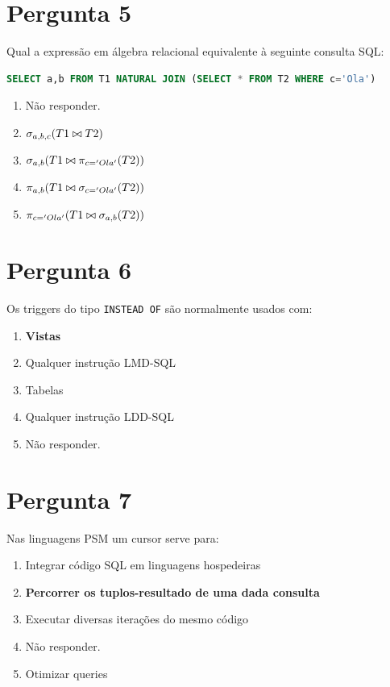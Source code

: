 {\newpage
\section{Pergunta 5}
Qual a expressão em álgebra relacional equivalente à seguinte consulta SQL:
\begin{lstlisting}[language=SQL]
SELECT a,b FROM T1 NATURAL JOIN (SELECT * FROM T2 WHERE c='Ola')
\end{lstlisting}
\begin{enumerate}[label=\alph*.]\itemsep0em
    \item Não responder.
    \item $\sigma_{a,b,c}(T1 \bowtie T2)$
    \item $\sigma_{a,b}(T1 \bowtie \pi_{c='Ola'}(T2))$
    \item \textbf{$\pi_{a,b}(T1 \bowtie \sigma_{c='Ola'}(T2))$ \greencheckmark}
    \item $\pi_{c='Ola'}(T1 \bowtie \sigma_{a,b}(T2))$
\end{enumerate}

\section{Pergunta 6}
Os triggers do tipo \texttt{INSTEAD OF} são normalmente usados com:
\begin{enumerate}[label=\alph*.]\itemsep0em
    \item \textbf{Vistas \greencheckmark}
    \item Qualquer instrução LMD-SQL
    \item Tabelas
    \item Qualquer instrução LDD-SQL
    \item Não responder.
\end{enumerate}

\section{Pergunta 7}
Nas linguagens PSM um cursor serve para:
\begin{enumerate}[label=\alph*.]\itemsep0em
    \item Integrar código SQL em linguagens hospedeiras
    \item \textbf{Percorrer os tuplos-resultado de uma dada consulta \greencheckmark}
    \item Executar diversas iterações do mesmo código
    \item Não responder.
    \item Otimizar queries
\end{enumerate}

}
